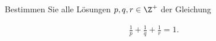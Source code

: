 
\begin{exercise}

Bestimmen Sie alle Lösungen $p,q,r \in \Z^+$ der Gleichung

\begin{align*}
    \frac{1}{p} + \frac{1}{q} + \frac{1}{r} = 1.
\end{align*}

\end{exercise}


\begin{solution}

\phantom{}

\end{solution}

